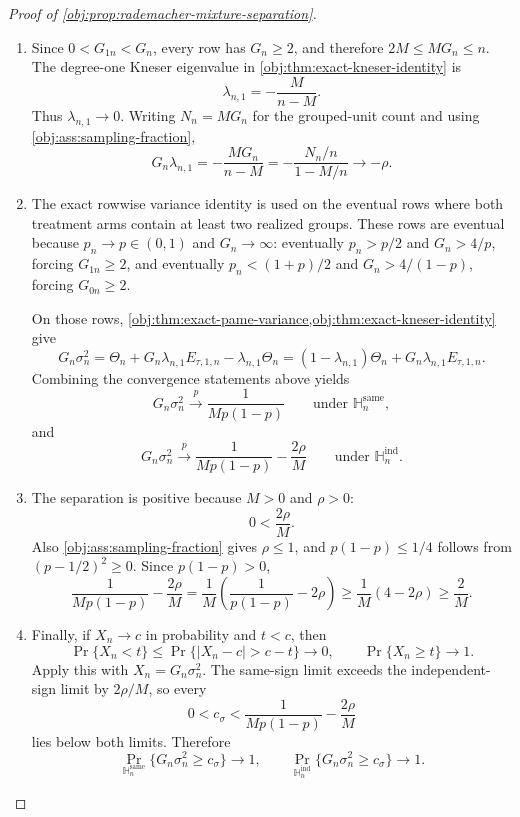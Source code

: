 \begin{proof}[Proof of \cref{obj:prop:rademacher-mixture-separation}]
\begin{enumerate}
\item Since \(0<G_{1n}<G_n\), every row has \(G_n\ge2\), and therefore \(2M\le M G_n\le n\).  The degree-one Kneser eigenvalue in \cref{obj:thm:exact-kneser-identity} is
\[
\lambda_{n,1}=-\frac{M}{n-M}.
\]
Thus \(\lambda_{n,1}\to0\).  Writing \(N_n=M G_n\) for the grouped-unit count and using \cref{obj:ass:sampling-fraction},
\[
G_n\lambda_{n,1}
=
-\frac{M G_n}{n-M}
=
-\frac{N_n/n}{1-M/n}
\longrightarrow
-\rho .
\]

\item The exact rowwise variance identity is used on the eventual rows where both treatment arms contain at least two realized groups.  These rows are eventual because \(p_n\to p\in(0,1)\) and \(G_n\to\infty\): eventually \(p_n>p/2\) and \(G_n>4/p\), forcing \(G_{1n}\ge2\), and eventually \(p_n<(1+p)/2\) and \(G_n>4/(1-p)\), forcing \(G_{0n}\ge2\).

On those rows, \cref{obj:thm:exact-pame-variance,obj:thm:exact-kneser-identity} give
\[
G_n\sigma_n^2
=
\Theta_n+G_n\lambda_{n,1}E_{\tau,1,n}
-\lambda_{n,1}\Theta_n
=
(1-\lambda_{n,1})\Theta_n
+
G_n\lambda_{n,1}E_{\tau,1,n}.
\]
Combining the convergence statements above yields
\[
G_n\sigma_n^2
\stackrel{p}{\longrightarrow}
\frac1{M p(1-p)}
\qquad
\text{under }\mathbb H_n^{\mathrm{same}},
\]
and
\[
G_n\sigma_n^2
\stackrel{p}{\longrightarrow}
\frac1{M p(1-p)}-\frac{2\rho}{M}
\qquad
\text{under }\mathbb H_n^{\mathrm{ind}}.
\]

\item The separation is positive because \(M>0\) and \(\rho>0\):
\[
0<\frac{2\rho}{M}.
\]
Also \cref{obj:ass:sampling-fraction} gives \(\rho\le1\), and \(p(1-p)\le1/4\) follows from \((p-1/2)^2\ge0\).  Since \(p(1-p)>0\),
\[
\frac{1}{M p(1-p)}-\frac{2\rho}{M}
=
\frac1M\left(\frac1{p(1-p)}-2\rho\right)
\ge
\frac1M(4-2\rho)
\ge
\frac2M .
\]

\item Finally, if \(X_n\to c\) in probability and \(t<c\), then
\[
\Pr\{X_n<t\}
\le
\Pr\{|X_n-c|>c-t\}
\to0,
\qquad
\Pr\{X_n\ge t\}\to1.
\]
Apply this with \(X_n=G_n\sigma_n^2\).  The same-sign limit exceeds the independent-sign limit by \(2\rho/M\), so every
\[
0<c_\sigma<\frac{1}{M p(1-p)}-\frac{2\rho}{M}
\]
lies below both limits.  Therefore
\[
\Pr_{\mathbb H_n^{\mathrm{same}}}\{G_n\sigma_n^2\ge c_\sigma\}\to1,
\qquad
\Pr_{\mathbb H_n^{\mathrm{ind}}}\{G_n\sigma_n^2\ge c_\sigma\}\to1.
\]
\end{enumerate}
\end{proof}

